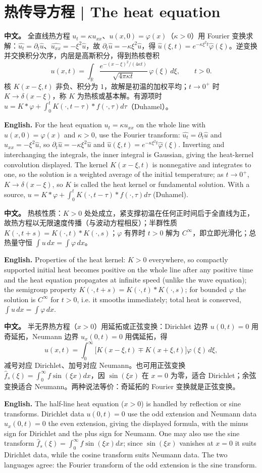 \documentclass[UTF8,11pt,a4paper]{ctexart}
\newcommand{\APS}[2]{\par\noindent\textbf{中文。} #1\par\noindent\textbf{English.} #2\par\smallskip}
\begin{document}
\section[热传导方程]{热传导方程 | The heat equation}
\APS{全直线热方程 $u_t=\kappa u_{xx}$、$u(x,0)=\varphi(x)$（$\kappa>0$）用 Fourier 变换求解：$\widehat{u_t}=\partial_t\widehat u$、$\widehat{u_{xx}}=-\xi^2\widehat u$，故 $\partial_t\widehat u=-\kappa\xi^2\widehat u$，得 $\widehat u(\xi,t)=e^{-\kappa\xi^2t}\widehat\varphi(\xi)$。逆变换并交换积分次序，内层是高斯积分，得到热核卷积
\[
u(x,t)=\int_{\mathbb R}\frac{e^{-(x-\xi)^2/(4\kappa t)}}{\sqrt{4\pi\kappa t}}\,\varphi(\xi)\,d\xi,\qquad t>0 .
\]
核 $K(x-\xi,t)$ 非负、积分为 $1$，故解是初温的加权平均；$t\to0^+$ 时 $K\to\delta(x-\xi)$，称 $K$ 为热核或基本解。有源项时 $u=K*\varphi+\int_0^tK(\cdot,t-\tau)*f(\cdot,\tau)d\tau$（Duhamel）。}{For the heat equation $u_t=\kappa u_{xx}$ on the whole line with $u(x,0)=\varphi(x)$ and $\kappa>0$, use the Fourier transform: $\widehat{u_t}=\partial_t\widehat u$ and $\widehat{u_{xx}}=-\xi^2\widehat u$, so $\partial_t\widehat u=-\kappa\xi^2\widehat u$ and $\widehat u(\xi,t)=e^{-\kappa\xi^2t}\widehat\varphi(\xi)$. Inverting and interchanging the integrals, the inner integral is Gaussian, giving the heat-kernel convolution displayed. The kernel $K(x-\xi,t)$ is nonnegative and integrates to one, so the solution is a weighted average of the initial temperature; as $t\to0^+$, $K\to\delta(x-\xi)$, so $K$ is called the heat kernel or fundamental solution. With a source, $u=K*\varphi+\int_0^tK(\cdot,t-\tau)*f(\cdot,\tau)d\tau$ (Duhamel).}
\APS{热核性质：$K>0$ 处处成立，紧支撑初温在任何正时间后于全直线为正，故热方程以无限速度传播（与波动方程相反）；半群性质 $K(\cdot,t+s)=K(\cdot,t)*K(\cdot,s)$；$\varphi$ 有界时 $t>0$ 解为 $C^\infty$，即立即光滑化；总热量守恒 $\int u\,dx=\int\varphi\,dx$。}{Properties of the heat kernel: $K>0$ everywhere, so compactly supported initial heat becomes positive on the whole line after any positive time and the heat equation propagates at infinite speed (unlike the wave equation); the semigroup property $K(\cdot,t+s)=K(\cdot,t)*K(\cdot,s)$; for bounded $\varphi$ the solution is $C^\infty$ for $t>0$, i.e. it smooths immediately; total heat is conserved, $\int u\,dx=\int\varphi\,dx$.}
\APS{半无界热方程（$x>0$）用延拓或正弦变换：Dirichlet 边界 $u(0,t)=0$ 用奇延拓，Neumann 边界 $u_x(0,t)=0$ 用偶延拓，得
\[
u(x,t)=\int_0^\infty\bigl[K(x-\xi,t)\mp K(x+\xi,t)\bigr]\varphi(\xi)\,d\xi,
\]
减号对应 Dirichlet、加号对应 Neumann。也可用正弦变换 $\widehat f_s(\xi)=\int_0^\infty f\sin(\xi x)dx$，因 $\sin(\xi x)$ 在 $x=0$ 为零，适合 Dirichlet；余弦变换适合 Neumann。两种说法等价：奇延拓的 Fourier 变换就是正弦变换。}{The half-line heat equation ($x>0$) is handled by reflection or sine transforms. Dirichlet data $u(0,t)=0$ use the odd extension and Neumann data $u_x(0,t)=0$ the even extension, giving the displayed formula, with the minus sign for Dirichlet and the plus sign for Neumann. One may also use the sine transform $\widehat f_s(\xi)=\int_0^\infty f\sin(\xi x)dx$; since $\sin(\xi x)$ vanishes at $x=0$ it suits Dirichlet data, while the cosine transform suits Neumann data. The two languages agree: the Fourier transform of the odd extension is the sine transform.}
\end{document}

